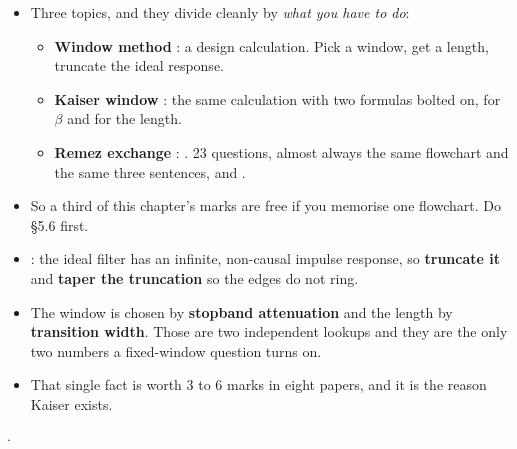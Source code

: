 \begin{itemize}
  \item Three topics, and they divide cleanly by \emph{what you have to do}:
  \begin{itemize}
    \item \textbf{Window method} : a design calculation. Pick a window, get a
          length, truncate the ideal response.
    \item \textbf{Kaiser window} : the same calculation with two formulas
          bolted on, for $\beta$ and for the length.
    \item \textbf{Remez exchange} : . 23 questions, almost
          always the same flowchart and the same three sentences, and .
  \end{itemize}
  \item So a third of this chapter's marks are free if you memorise one flowchart.
        Do \S5.6 first.
  \item {}: the ideal filter has an infinite,
        non-causal impulse response, so \textbf{truncate it} and \textbf{taper the
        truncation} so the edges do not ring.
  \item The window is chosen by \textbf{stopband attenuation} and the length by
        \textbf{transition width}. Those are two independent lookups and they are the
        only two numbers a fixed-window question turns on.
  \item {} That single
        fact is worth 3 to 6 marks in eight papers, and it is the reason Kaiser exists.
\end{itemize}

\hr


{\color{sub}\footnotesize {} 
\gap$\cdot$\gap {}}

